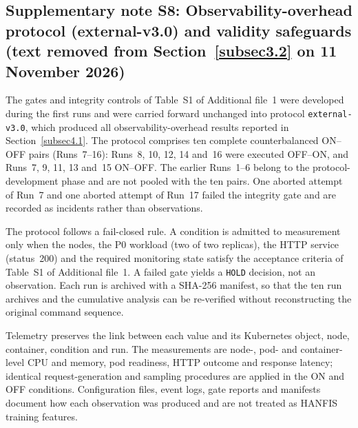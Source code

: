 \documentclass[pdflatex,sn-basic]{sn-jnl}
\theoremstyle{thmstyleone}%
\theoremstyle{thmstyletwo}%
\theoremstyle{thmstylethree}%
\begin{document}
\subsection*{Supplementary note S8: Observability-overhead protocol (external-v3.0) and validity safeguards (text removed from Section~\ref{subsec3.2} on 11 November 2026)}
The gates and integrity controls of Table~S1 of Additional file~1 were developed during the first runs and were carried forward unchanged into protocol \texttt{external-v3.0}, which produced all observability-overhead results reported in Section~\ref{subsec4.1}. The protocol comprises ten complete counterbalanced ON--OFF pairs (Runs~7--16): Runs~8, 10, 12, 14 and~16 were executed OFF--ON, and Runs~7, 9, 11, 13 and~15 ON--OFF. The earlier Runs~1--6 belong to the protocol-development phase and are not pooled with the ten pairs. One aborted attempt of Run~7 and one aborted attempt of Run~17 failed the integrity gate and are recorded as incidents rather than observations.

The protocol follows a fail-closed rule. A condition is admitted to measurement only when the nodes, the P0 workload (two of two replicas), the HTTP service (status~200) and the required monitoring state satisfy the acceptance criteria of Table~S1 of Additional file~1. A failed gate yields a \texttt{HOLD} decision, not an observation. Each run is archived with a SHA-256 manifest, so that the ten run archives and the cumulative analysis can be re-verified without reconstructing the original command sequence.

Telemetry preserves the link between each value and its Kubernetes object, node, container, condition and run. The measurements are node-, pod- and container-level CPU and memory, pod readiness, HTTP outcome and response latency; identical request-generation and sampling procedures are applied in the ON and OFF conditions. Configuration files, event logs, gate reports and manifests document how each observation was produced and are not treated as HANFIS training features.
\end{document}

